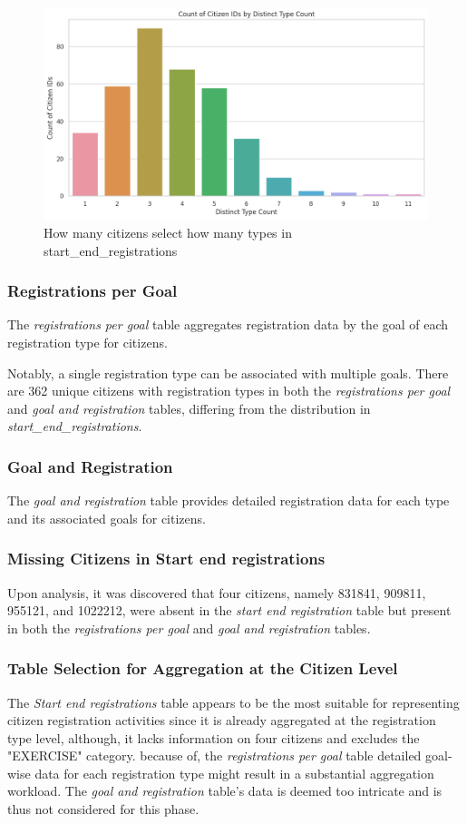 \documentclass[12pt]{article}
\begin{document}
\begin{figure}[h]
\centering
\includegraphics[width=0.7\linewidth]{images/start_end_reg_count.png}
\caption{How many citizens select how many types in start\_end\_registrations}
\label{fig:howmanytypes}
\end{figure}

\subsubsection{Registrations per Goal}
The \textit{registrations per goal} table aggregates registration data by the goal of each registration type for citizens. 

Notably, a single registration type can be associated with multiple goals. There are 362 unique citizens with registration types in both the \textit{registrations per goal} and \textit{goal and registration} tables, differing from the distribution in \textit{start\_end\_registrations}.

\subsubsection{Goal and Registration}
The \textit{goal and registration} table provides detailed registration data for each type and its associated goals for citizens.

\subsubsection{Missing Citizens in Start end registrations}
Upon analysis, it was discovered that four citizens, namely 831841, 909811, 955121, and 1022212, were absent in the \textit{start end registration} table but present in both the \textit{registrations per goal} and \textit{goal and registration} tables.

\subsubsection{Table Selection for Aggregation at the Citizen Level}
The \textit{Start end registrations} table appears to be the most suitable for representing citizen registration activities since it is already aggregated at the registration type level, although, it lacks information on four citizens and excludes the "EXERCISE" category. because of, the \textit{registrations per goal} table detailed goal-wise data for each registration type might result in a substantial aggregation workload. The \textit{goal and registration} table's data is deemed too intricate and is thus not considered for this phase.
\end{document}
